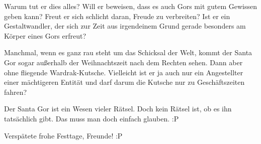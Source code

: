 \documentclass[10pt, a4paper, oneside]{book}
\begin{document}
Warum tut er dies alles? Will er beweisen, dass es auch Gors mit gutem Gewissen geben kann? Freut er sich schlicht daran, Freude zu verbreiten? Ist er ein Gestaltwandler, der sich zur Zeit aus irgendeinem Grund gerade besonders am Körper eines Gors erfreut?

Manchmal, wenn es ganz rau steht um das Schicksal der Welt, kommt der Santa Gor sogar außerhalb der Weihnachtszeit nach dem Rechten sehen. Dann aber ohne fliegende Wardrak-Kutsche. Vielleicht ist er ja auch nur ein Angestellter einer mächtigeren Entität und darf darum die Kutsche nur zu Geschäftszeiten fahren?

Der Santa Gor ist ein Wesen vieler Rätsel. Doch kein Rätsel ist, ob es ihn tatsächlich gibt. Das muss man doch einfach glauben. :P\bigskip



Verspätete frohe Festtage, Freunde! :P
\end{document}
